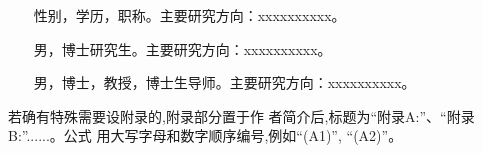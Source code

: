 \documentclass[10.5pt,twocolumn]{jthu-st}
\begin{document}
{
\renewcommand{\baselinestretch}{0.9}
\liuhao


}



{
\xiaowuhao
{}

~~~ 性别，学历，职称。主要研究方向：xxxxxxxxxx。
\vskip 16pt

~~~ 男，博士研究生。主要研究方向：xxxxxxxxxx。
\vskip 16pt

~~~ 男，博士，教授，博士生导师。主要研究方向：xxxxxxxxxx。
}


\vskip 20pt
 
 
若确有特殊需要设附录的,附录部分置于作
者简介后,标题为“附录A:”、“附录B:”......。公式
用大写字母和数字顺序编号,例如“(A1)”, “(A2)”。




\clearpage
\newpage
\pagestyle{fancy}
\fancyhf{}
\lhead{}
\rhead{}
\lfoot{}
\cfoot{}
\rfoot{}
\renewcommand{\headrule}{%
\hrule height0.4pt width \headwidth \vskip1.0pt%
\hrule height0.4pt width \headwidth \vskip-2pt}
\end{document}
